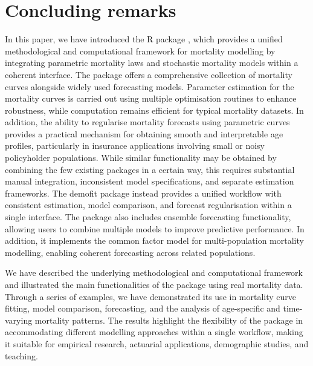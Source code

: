 \clearpage

\section{Concluding remarks}\label{concluding-remarks}

In this paper, we have introduced the R package , which provides a unified methodological and computational framework for mortality modelling by integrating parametric mortality laws and stochastic mortality models within a coherent interface. The package offers a comprehensive collection of mortality curves alongside widely used forecasting models. Parameter estimation for the mortality curves is carried out using multiple optimisation routines to enhance robustness, while computation remains efficient for typical mortality datasets. In addition, the ability to regularise mortality forecasts using parametric curves provides a practical mechanism for obtaining smooth and interpretable age profiles, particularly in insurance applications involving small or noisy policyholder populations. While similar functionality may be obtained by combining the few existing packages in a certain way, this requires substantial manual integration, inconsistent model specifications, and separate estimation frameworks. The demofit package instead provides a unified workflow with consistent estimation, model comparison, and forecast regularisation within a single interface. The package also includes ensemble forecasting functionality, allowing users to combine multiple models to improve predictive performance. In addition, it implements the common factor model for multi-population mortality modelling, enabling coherent forecasting across related populations.

We have described the underlying methodological and computational framework and illustrated the main functionalities of the package using real mortality data. Through a series of examples, we have demonstrated its use in mortality curve fitting, model comparison, forecasting, and the analysis of age-specific and time-varying mortality patterns. The results highlight the flexibility of the package in accommodating different modelling approaches within a single workflow, making it suitable for empirical research, actuarial applications, demographic studies, and teaching.

